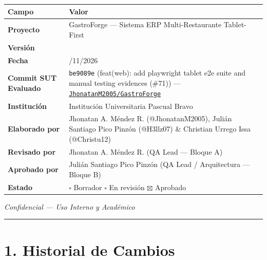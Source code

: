 \documentclass[10pt,a4paper]{article}
\newcounter{none}
\begin{document}
{\def\LTcaptype{none} %
\begin{longtable}[]{@{}
  >{\raggedright\arraybackslash}p{}
  >{\raggedright\arraybackslash}p{}@{}}
\toprule\noalign{}
\begin{minipage}[b]{\linewidth}\raggedright
Campo
\end{minipage} & \begin{minipage}[b]{\linewidth}\raggedright
Valor
\end{minipage} \\
\midrule\noalign{}
\endhead
\bottomrule\noalign{}
\endlastfoot
\textbf{Proyecto} & GastroForge --- Sistema ERP Multi-Restaurante Tablet-First \\
\textbf{Versión} & 1.1 \\
\textbf{Fecha} & 17/11/2026 \\
\textbf{Commit SUT Evaluado} & \texttt{be9089e} (feat(web): add playwright tablet e2e suite and manual testing evidences (\#71)) --- \href{https://github.com/JhonatanM2005/GastroForge}{\texttt{JhonatanM2005/\allowbreak{}GastroForge}} \\
\textbf{Institución} & Institución Universitaria Pascual Bravo \\
\textbf{Elaborado por} & Jhonatan A. Méndez R. (@JhonatanM2005), Julián Santiago Pico Pinzón (@H3llz07) \& Christian Urrego Issa (@Christu12) \\
\textbf{Revisado por} & Jhonatan A. Méndez R. (QA Lead --- Bloque A) \\
\textbf{Aprobado por} & Julián Santiago Pico Pinzón (QA Lead / Arquitectura --- Bloque B) \\
\textbf{Estado} & \ensuremath{\square} Borrador \ensuremath{\square} En revisión \ensuremath{\boxtimes} Aprobado \\
\end{longtable}
}

\endgroup\medskip

\emph{Confidencial --- Uso Interno y Académico}

\begin{center}\rule{0.5\linewidth}{0.5pt}\end{center}


\section{1. Historial de Cambios}\label{1-historial-de-cambios}
\end{document}
